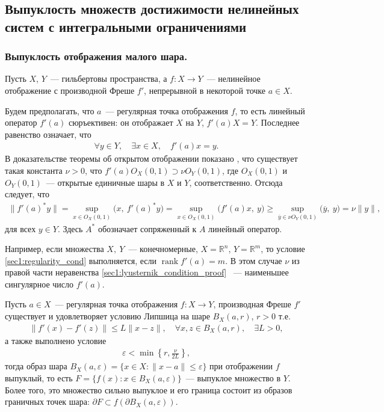 \documentclass[../main.tex]{subfiles}
\begin{document}
\subsection{Выпуклость множеств достижимости нелинейных систем с интегральными ограничениями}
\subsubsection{Выпуклость отображения малого шара.}
Пусть $X$, $Y$~--- гильбертовы пространства, а $f: X \rightarrow Y$~--- нелинейное отображение с производной Фреше $f'$, непрерывной в некоторой точке $a \in X$.
    
Будем предполагать, что $a$~--- регулярная точка отображения $f$, то есть линейный оператор $f'(a)$ сюръективен: он отображает $X$ на $Y$, $ f'(a) X = Y $.
Последнее равенство означает, что 
\begin{gather}\label{sec1:regularity_cond}
    \forall y \in Y, \quad \exists x \in X, \quad f'(a) x = y.
\end{gather}
В доказательстве теоремы об открытом отображении показано \cite[Теорема 2.11, Теорема 4.13]{Rudin}, что существует такая константа $\nu > 0$, что $f'(a) O_X(0, 1) \supset \nu O_Y(0, 1)$, где $ O_X(0, 1)$ и  $O_Y(0, 1)$~--- открытые единичные шары в $X$ и $Y$, соответственно.
Отсюда следует, что
\begin{gather}\label{sec1:lyusternik_condition_proof}
    \| f'(a)^* y \| = \sup\limits_{x \in O_X(0, 1)} \big(x,\  f'(a)^* y\big) =  \sup\limits_{x \in O_X(0, 1)} \big(f'(a) x,\  y\big) \geqslant  \sup\limits_{\overline{y} \in \nu O_Y(0, 1)} \big(\overline{y},\  y\big) = \nu \|y\|,
\end{gather}
для всех $y \in Y$.
Здесь $A^*$ обозначает сопряженный к $A$ линейный оператор.
    
Например, если множества $X,\ Y$~--- конечномерные, $X = \mathbb{R}^n$, $Y = \mathbb{R}^m$, то условие \eqref{sec1:regularity_cond} выполняется, если  $ \operatorname{rank} f'(a) = m$.
В этом случае $\nu$ из правой части неравенства \eqref{sec1:lyusternik_condition_proof} ~--- наименьшее сингулярное число $f'(a)$. 
\begin{theorem}\label{sec1:th:PolyakTh}
    Пусть $a \in X$~--- регулярная точка отображения $f: X \rightarrow Y$, производная Фреше $f'$ существует и удовлетворяет условию Липшица на шаре  $B_X(a,r) $, $r > 0$  т.е. 
    \begin{gather}\label{sec1:lip_cond}
        \| f'(x) - f'(z) \| \leqslant L \| x - z \|, \quad \forall x,z \in B_X(a,r), \quad \exists L > 0,
    \end{gather}
    а также выполнено условие
    \begin{gather}
        \varepsilon < \min\left\{r,\frac{\nu}{2L}\right\},
    \end{gather}
    тогда образ шара $B_X(a,\varepsilon) = \{x \in X: \| x - a\| \leqslant \varepsilon\}$ при отображении $f$ выпуклый, то есть $F = \{f(x): x \in B_X(a,\varepsilon)\}$~--- выпуклое множество в $Y$.
    Более того, это множество сильно выпуклое и его граница состоит из образов граничных точек шара: $\partial F \subset f(\partial B_X(a,\varepsilon))$.
\end{theorem}
    
\end{document}
